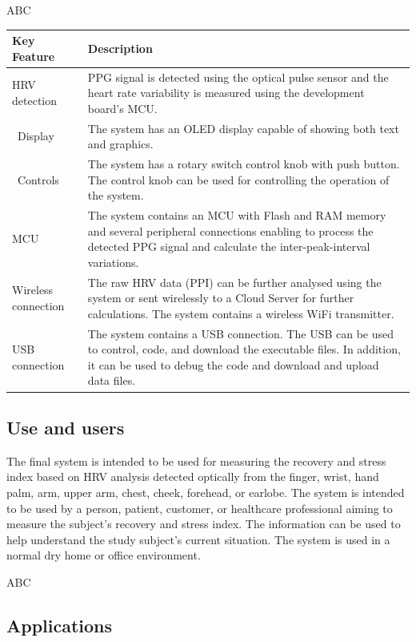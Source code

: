 \documentclass{article}
\begin{document}
ABC


\begin{table}
\begin{tabular}{|p{4cm}|p{7cm}|}
\hline
\textbf{Key Feature} & \textbf{Description} \\
\hline
HRV detection & PPG signal is detected using the optical pulse sensor and the heart rate variability is measured using the development board’s MCU. \\
\hline\
Display & The system has an OLED display capable of showing both text and graphics. \\
\hline\
Controls & The system has a rotary switch control knob with push button. The control knob can be used for controlling the operation of the system. \\
\hline
MCU & The system contains an MCU with Flash and RAM memory and several peripheral connections enabling to process the detected PPG signal and calculate the inter-peak-interval variations. \\
\hline
Wireless connection & The raw HRV data (PPI) can be further analysed using the system or sent wirelessly to a Cloud Server for further calculations. The system contains a wireless WiFi transmitter. \\
\hline
USB connection & The system contains a USB connection. The USB can be used to control, code, and download the executable files. In addition, it can be used to debug the code and download and upload data files. \\
\hline
\end{tabular}
\end{table}

\subsection{Use and users}
The final system is intended to be used for measuring the recovery and stress index based
on HRV analysis detected optically from the finger, wrist, hand palm, arm, upper arm, chest,
cheek, forehead, or earlobe.
The system is intended to be used by a person, patient, customer, or healthcare professional
aiming to measure the subject’s recovery and stress index. The information can be used to
help understand the study subject’s current situation. The system is used in a normal dry
home or office environment.

ABC

\subsection{Applications}
\end{document}
